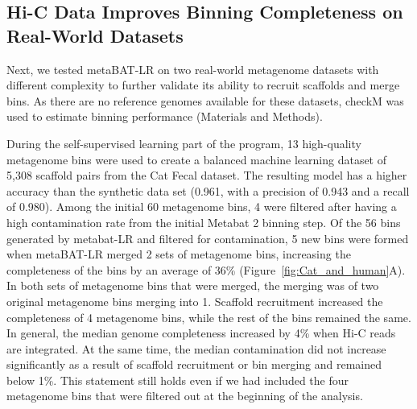\documentclass[fleqn,10pt,lineno]{wlpeerj}
\begin{document}

\subsection*{Hi-C Data Improves Binning Completeness on Real-World Datasets}

Next, we tested metaBAT-LR on two real-world metagenome datasets with different complexity to further validate its ability to recruit scaffolds and merge bins. As there are no reference genomes available for these datasets, checkM was used to estimate binning performance (Materials and Methods). 

During the self-supervised learning part of the program, 13 high-quality metagenome bins were used to create a balanced machine learning dataset of 5,308 scaffold pairs from the Cat Fecal dataset. The resulting model has a higher accuracy than the synthetic data set (0.961, with a precision of 0.943 and a recall of 0.980). Among the initial 60 metagenome bins, 4 were filtered after having a high contamination rate from the initial Metabat 2 binning step. Of the 56 bins generated by metabat-LR and filtered for contamination, 5 new bins were formed when metaBAT-LR merged 2 sets of metagenome bins, increasing the completeness of the bins by an average of 36\% (Figure~\ref{fig:Cat_and_human}A). In both sets of metagenome bins that were merged, the merging was of two original metagenome bins merging into 1. Scaffold recruitment increased the completeness of 4 metagenome bins, while the rest of the bins remained the same. In general, the median genome completeness increased by 4\% when Hi-C reads are integrated. At the same time, the median contamination did not increase significantly as a result of scaffold recruitment or bin merging and remained below 1\%. This statement still holds even if we had included the four metagenome bins that were filtered out at the beginning of the analysis.     
\end{document}
